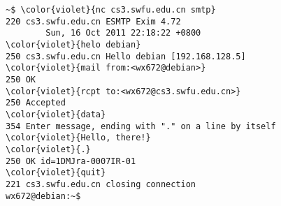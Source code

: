 \documentclass[varwidth=28.5em,crop]{standalone}
\begin{document}
\pagestyle{empty}

\begin{Verbatim}[commandchars=\\\{\}]
~$ \color{violet}{nc cs3.swfu.edu.cn smtp}
220 cs3.swfu.edu.cn ESMTP Exim 4.72
        Sun, 16 Oct 2011 22:18:22 +0800
\color{violet}{helo debian}
250 cs3.swfu.edu.cn Hello debian [192.168.128.5]
\color{violet}{mail from:<wx672@debian>}
250 OK
\color{violet}{rcpt to:<wx672@cs3.swfu.edu.cn>}
250 Accepted
\color{violet}{data}
354 Enter message, ending with "." on a line by itself
\color{violet}{Hello, there!}
\color{violet}{.}
250 OK id=1DMJra-0007IR-01
\color{violet}{quit}
221 cs3.swfu.edu.cn closing connection
wx672@debian:~$
\end{Verbatim}
\end{document}
